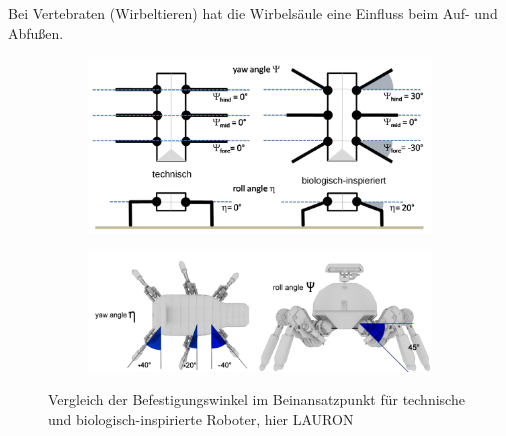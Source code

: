 Bei Vertebraten (Wirbeltieren) hat die Wirbelsäule eine Einfluss beim Auf- und Abfußen.

\begin{figure}
	\centering
	\begin{subfigure}{.8\textwidth}
		\centering
		\includegraphics[width=\textwidth]{figures/befestigungswinkel.png}
	\end{subfigure}\par\medskip
	\begin{subfigure}{.5\textwidth}
		\centering
		\includegraphics[width=\textwidth]{figures/befestigungswinkel_1.png}
	\end{subfigure}
	\caption{Vergleich der Befestigungswinkel im Beinansatzpunkt für technische und biologisch-inspirierte Roboter, hier LAURON}
\end{figure}
\newpage
